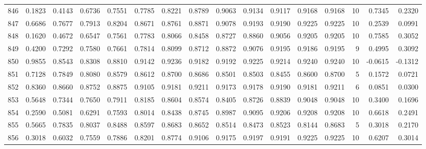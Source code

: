 \begin{tabular}{lrrrrrrrrrrrrrrr}
846 &      0.1823 &  0.4143 &  0.6736 &  0.7551 &  0.7785 &  0.8221 &  0.8789 &  0.9063 &  0.9134 &  0.9117 &   0.9168 &     0.9168 &     10 &                    0.7345 &                     0.2320 \\
847 &      0.6686 &  0.7677 &  0.7913 &  0.8204 &  0.8671 &  0.8761 &  0.8871 &  0.9078 &  0.9193 &  0.9190 &   0.9225 &     0.9225 &     10 &                    0.2539 &                     0.0991 \\
848 &      0.1620 &  0.4672 &  0.6547 &  0.7561 &  0.7783 &  0.8066 &  0.8458 &  0.8727 &  0.8860 &  0.9056 &   0.9205 &     0.9205 &     10 &                    0.7585 &                     0.3052 \\
849 &      0.4200 &  0.7292 &  0.7580 &  0.7661 &  0.7814 &  0.8099 &  0.8712 &  0.8872 &  0.9076 &  0.9195 &   0.9186 &     0.9195 &      9 &                    0.4995 &                     0.3092 \\
850 &      0.9855 &  0.8543 &  0.8308 &  0.8810 &  0.9142 &  0.9236 &  0.9182 &  0.9192 &  0.9225 &  0.9214 &   0.9240 &     0.9240 &     10 &                   -0.0615 &                    -0.1312 \\
851 &      0.7128 &  0.7849 &  0.8080 &  0.8579 &  0.8612 &  0.8700 &  0.8686 &  0.8501 &  0.8503 &  0.8455 &   0.8600 &     0.8700 &      5 &                    0.1572 &                     0.0721 \\
852 &      0.8360 &  0.8660 &  0.8752 &  0.8875 &  0.9105 &  0.9181 &  0.9211 &  0.9173 &  0.9178 &  0.9190 &   0.9181 &     0.9211 &      6 &                    0.0851 &                     0.0300 \\
853 &      0.5648 &  0.7344 &  0.7650 &  0.7911 &  0.8185 &  0.8604 &  0.8574 &  0.8405 &  0.8726 &  0.8839 &   0.9048 &     0.9048 &     10 &                    0.3400 &                     0.1696 \\
854 &      0.2590 &  0.5081 &  0.6291 &  0.7593 &  0.8014 &  0.8438 &  0.8745 &  0.8987 &  0.9095 &  0.9206 &   0.9208 &     0.9208 &     10 &                    0.6618 &                     0.2491 \\
855 &      0.5665 &  0.7835 &  0.8037 &  0.8488 &  0.8597 &  0.8683 &  0.8652 &  0.8514 &  0.8473 &  0.8523 &   0.8144 &     0.8683 &      5 &                    0.3018 &                     0.2170 \\
856 &      0.3018 &  0.6032 &  0.7559 &  0.7886 &  0.8201 &  0.8774 &  0.9106 &  0.9175 &  0.9197 &  0.9191 &   0.9225 &     0.9225 &     10 &                    0.6207 &                     0.3014 \\

\end{tabular}
